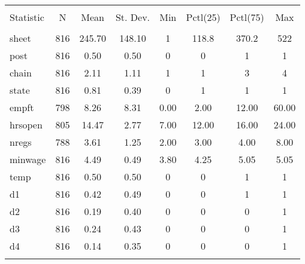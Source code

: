 
\begin{table}[!htbp] \centering 
  \caption{} 
  \label{} 
\begin{tabular}{@{\extracolsep{5pt}}lccccccc} 
\\[-1.8ex]\hline 
\hline \\[-1.8ex] 
Statistic & \multicolumn{1}{c}{N} & \multicolumn{1}{c}{Mean} & \multicolumn{1}{c}{St. Dev.} & \multicolumn{1}{c}{Min} & \multicolumn{1}{c}{Pctl(25)} & \multicolumn{1}{c}{Pctl(75)} & \multicolumn{1}{c}{Max} \\ 
\hline \\[-1.8ex] 
sheet & 816 & 245.70 & 148.10 & 1 & 118.8 & 370.2 & 522 \\ 
post & 816 & 0.50 & 0.50 & 0 & 0 & 1 & 1 \\ 
chain & 816 & 2.11 & 1.11 & 1 & 1 & 3 & 4 \\ 
state & 816 & 0.81 & 0.39 & 0 & 1 & 1 & 1 \\ 
empft & 798 & 8.26 & 8.31 & 0.00 & 2.00 & 12.00 & 60.00 \\ 
hrsopen & 805 & 14.47 & 2.77 & 7.00 & 12.00 & 16.00 & 24.00 \\ 
nregs & 788 & 3.61 & 1.25 & 2.00 & 3.00 & 4.00 & 8.00 \\ 
minwage & 816 & 4.49 & 0.49 & 3.80 & 4.25 & 5.05 & 5.05 \\ 
temp & 816 & 0.50 & 0.50 & 0 & 0 & 1 & 1 \\ 
d1 & 816 & 0.42 & 0.49 & 0 & 0 & 1 & 1 \\ 
d2 & 816 & 0.19 & 0.40 & 0 & 0 & 0 & 1 \\ 
d3 & 816 & 0.24 & 0.43 & 0 & 0 & 0 & 1 \\ 
d4 & 816 & 0.14 & 0.35 & 0 & 0 & 0 & 1 \\ 
\hline \\[-1.8ex] 
\end{tabular} 
\end{table} 
